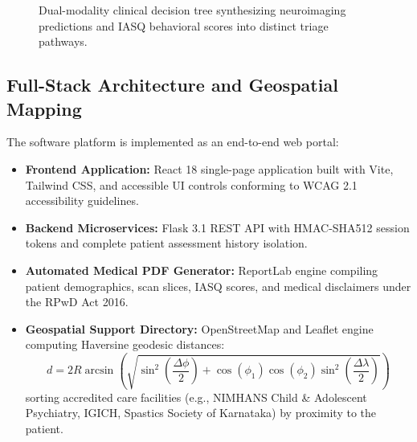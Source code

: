\documentclass[conference]{IEEEtran}
\begin{document}
\begin{figure}[!t]
{
}
\caption{Dual-modality clinical decision tree synthesizing neuroimaging predictions and IASQ behavioral scores into distinct triage pathways.}
\label{fig:simplified_decision}
\end{figure}

\subsection{Full-Stack Architecture and Geospatial Mapping}
The software platform is implemented as an end-to-end web portal:
\begin{itemize}
    \item \textbf{Frontend Application:} React 18 single-page application built with Vite, Tailwind CSS, and accessible UI controls conforming to WCAG 2.1 accessibility guidelines.
    \item \textbf{Backend Microservices:} Flask 3.1 REST API with HMAC-SHA512 session tokens and complete patient assessment history isolation.
    \item \textbf{Automated Medical PDF Generator:} ReportLab engine compiling patient demographics, scan slices, IASQ scores, and medical disclaimers under the RPwD Act 2016.
    \item \textbf{Geospatial Support Directory:} OpenStreetMap and Leaflet engine computing Haversine geodesic distances:
    \begin{equation}
    d = 2R \arcsin \left( \sqrt{\sin^2\left(\frac{\Delta \phi}{2}\right) + \cos(\phi_1)\cos(\phi_2)\sin^2\left(\frac{\Delta \lambda}{2}\right)} \right)
    \end{equation}
    sorting accredited care facilities (e.g., NIMHANS Child \& Adolescent Psychiatry, IGICH, Spastics Society of Karnataka) by proximity to the patient.
\end{itemize}

\end{document}

